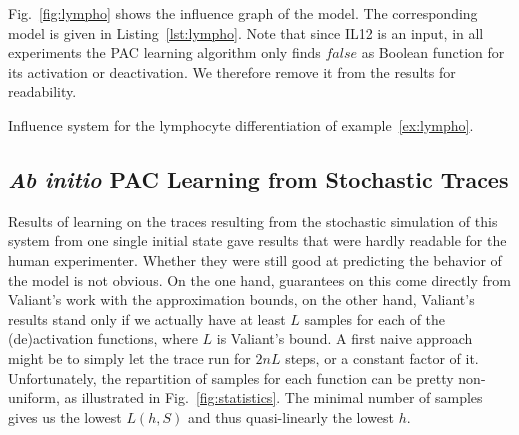 \documentclass{llncs}
\begin{document}
Fig.~\ref{fig:lympho} shows the influence graph of the model. The
corresponding model is given in Listing~\ref{lst:lympho}.
Note that since IL12 is an input, in all experiments the PAC learning
algorithm only finds $false$ as Boolean function for its activation or
deactivation. We therefore remove it from the results for readability.

\begin{listfig}[htb]
   
   \caption{Influence system for the lymphocyte differentiation of
   example~\ref{ex:lympho}.}\label{lst:lympho}
\end{listfig}

\subsection{\emph{Ab initio} PAC Learning from Stochastic Traces}
\label{sec:abinitio}

Results of learning on the traces resulting from the stochastic simulation of
this system from one single initial state gave results that were hardly
readable for the human experimenter. Whether they were still good at
predicting the behavior of the model is not obvious. On the one hand,
guarantees on this come directly from Valiant's work with the approximation
bounds, on the other hand,  Valiant's results stand only if we actually have
at least $L$ samples for each of the (de)activation functions, where $L$ is
Valiant's bound. A first naive approach might be to simply let the trace run
for $2nL$ steps, or a constant factor of it. Unfortunately, the repartition of
samples for each function can be pretty non-uniform, as illustrated in
Fig.~\ref{fig:statistics}. The minimal number of samples gives us the lowest
$L(h, S)$ and thus quasi-linearly the lowest $h$.
\end{document}
